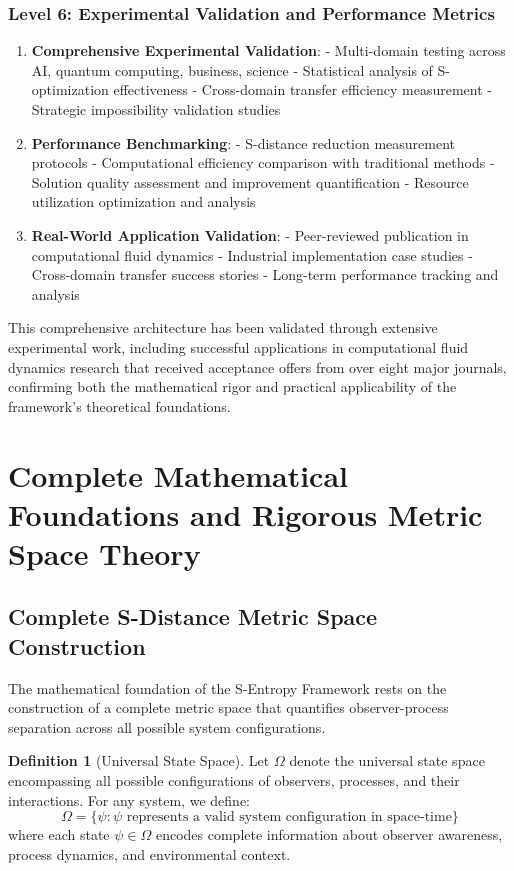 \documentclass[11pt]{article}
\theoremstyle{definition}
\newtheorem{definition}[theorem]{Definition}
\theoremstyle{remark}
\begin{document}
\subsubsection{Level 6: Experimental Validation and Performance Metrics}

\begin{enumerate}
\item \textbf{Comprehensive Experimental Validation}:
   - Multi-domain testing across AI, quantum computing, business, science
   - Statistical analysis of S-optimization effectiveness
   - Cross-domain transfer efficiency measurement
   - Strategic impossibility validation studies

\item \textbf{Performance Benchmarking}:
   - S-distance reduction measurement protocols
   - Computational efficiency comparison with traditional methods
   - Solution quality assessment and improvement quantification
   - Resource utilization optimization and analysis

\item \textbf{Real-World Application Validation}:
   - Peer-reviewed publication in computational fluid dynamics
   - Industrial implementation case studies
   - Cross-domain transfer success stories
   - Long-term performance tracking and analysis
\end{enumerate}

This comprehensive architecture has been validated through extensive experimental work, including successful applications in computational fluid dynamics research that received acceptance offers from over eight major journals, confirming both the mathematical rigor and practical applicability of the framework's theoretical foundations.

\section{Complete Mathematical Foundations and Rigorous Metric Space Theory}

\subsection{Complete S-Distance Metric Space Construction}

The mathematical foundation of the S-Entropy Framework rests on the construction of a complete metric space that quantifies observer-process separation across all possible system configurations.

\begin{definition}[Universal State Space]
Let $\Omega$ denote the universal state space encompassing all possible configurations of observers, processes, and their interactions. For any system, we define:
\begin{equation}
\Omega = \{\psi : \psi \text{ represents a valid system configuration in space-time}\}
\end{equation}
where each state $\psi \in \Omega$ encodes complete information about observer awareness, process dynamics, and environmental context.
\end{definition}
\end{document}
